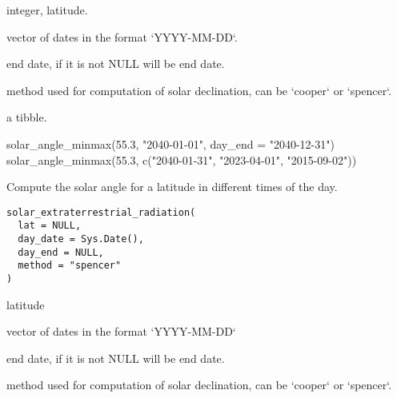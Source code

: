 \documentclass[a4paper]{book}
\begin{document}
%
\begin{Arguments}
\begin{ldescription}
\item[\code{lat}] integer, latitude.

\item[\code{day\_date}] vector of dates in the format `YYYY-MM-DD`.

\item[\code{day\_end}] end date, if it is not NULL will be end date.

\item[\code{method}] method used for computation of solar declination, can be `cooper` or `spencer`.
\end{ldescription}
\end{Arguments}
%
\begin{Value}
a tibble.
\end{Value}
%
\begin{Examples}
\begin{ExampleCode}
solar_angle_minmax(55.3, "2040-01-01", day_end = "2040-12-31")
solar_angle_minmax(55.3, c("2040-01-31", "2023-04-01", "2015-09-02"))
\end{ExampleCode}
\end{Examples}
%
\begin{Description}\relax
Compute the solar angle for a latitude in different times of the day.
\end{Description}
%
\begin{Usage}
\begin{verbatim}
solar_extraterrestrial_radiation(
  lat = NULL,
  day_date = Sys.Date(),
  day_end = NULL,
  method = "spencer"
)
\end{verbatim}
\end{Usage}
%
\begin{Arguments}
\begin{ldescription}
\item[\code{lat}] latitude

\item[\code{day\_date}] vector of dates in the format `YYYY-MM-DD`

\item[\code{day\_end}] end date, if it is not NULL will be end date.

\item[\code{method}] method used for computation of solar declination, can be `cooper` or `spencer`.
\end{ldescription}
\end{Arguments}
\end{document}
